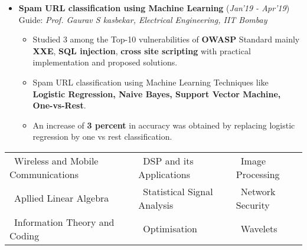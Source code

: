 \documentclass[10pt]{article}
\begin{document}
\begin{itemize}[leftmargin=0.4cm]
\begin{itemize}
	\end{itemize}\
	\vspace{-0.75cm}

\item \textbf{Spam URL classification using Machine Learning}
\hfill{(\textit{Jan'19 - Apr'19})}\\
Guide: \textit{Prof. Gaurav S kasbekar, Electrical Engineering, IIT Bombay}\\
\vspace{-0.7cm}
	\begin{itemize}
	\item Studied 3 among the Top-10 vulnerabilities of \textbf{OWASP} Standard mainly \textbf{XXE}, \textbf{SQL injection}, \textbf{cross site scripting} with practical implementation and proposed solutions.\vspace{-0.1cm}
	\item Spam URL classification using Machine Learning Techniques like \textbf{Logistic Regression, Naive Bayes, Support Vector Machine, One-vs-Rest}.
	\item An increase of \textbf{3 percent} in accuracy was obtained by replacing logistic regression by one vs rest classification.\vspace{-0.1cm}
    \end{itemize}

	\vspace{0.1cm}


\end{itemize}
\hspace{-0.17cm}\colorbox{bl}{}%
	\vspace{0.1cm} 


 	
		\begin{tabular}{ l l l }
		\hspace{0.55cm}\textbullet\ Wireless and Mobile Communications &  \textbullet\ DSP and its Applications & \textbullet\ Image Processing \\
		\hspace{0.55cm}\textbullet\ Apllied Linear Algebra & \textbullet\ Statistical Signal Analysis & \textbullet\ Network Security \\
		\hspace{0.55cm}\textbullet\ Information Theory and Coding & \textbullet\ Optimisation & \textbullet\ Wavelets\\
	\end{tabular}
	
\end{document}

